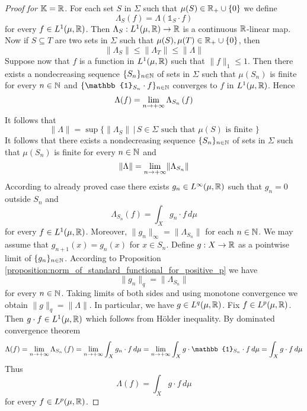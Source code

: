 \begin{proof}[Proof for $\mathbb{K}={\mathbb R}$]
  For each set $S$ in $\Sigma$ such that $\mu(S) \in {\mathbb R}_+\cup \{0\}$ we define
  $$\Lambda_S(f) = \Lambda\left(\mathbb{1}_S\cdot f\right)$$
  for every $f \in L^1(\mu,{\mathbb R})$. Then $\Lambda_S:L^1(\mu,{\mathbb R})\rightarrow {\mathbb R}$ is a continuous ${\mathbb R}$-linear map. Now if $S\subseteq T$ are two sets in $\Sigma$ such that $\mu(S),\mu(T) \in {\mathbb R}_+\cup \{0\}$, then
  $$\lVert \Lambda_S\rVert \leq \lVert \Lambda_T\rVert \leq \lVert \Lambda \rVert$$
  Suppose now that $f$ is a function in $L^1(\mu, {\mathbb R})$ such that $\lVert f \rVert_1 \leq 1$. Then there exists a nondecreasing sequence $\{S_n\}_{n\in {\mathbb N}}$ of sets in $\Sigma$ such that $\mu(S_n)$ is finite for every $n\in {\mathbb N}$ and $\{\mathbb{1}_{S_n}\cdot f\}_{n\in \NN}$ converges to $f$ in $L^1(\mu, {\mathbb R})$. Hence
  $$\Lambda(f) = \lim_{n\rightarrow +\infty}\Lambda_{S_n}\left(f\right)$$
  It follows that
  $$\lVert \Lambda \rVert = \sup \big\{\lVert \Lambda_S \rVert\,\big|\,S\in \Sigma\mbox{ such that }\mu(S)\mbox{ is finite }\}$$
  It follows that there exists a nondecreasing sequence $\{S_n\}_{n\in {\mathbb N}}$ of sets in $\Sigma$ such that $\mu(S_n)$ is finite for every $n\in {\mathbb N}$ and
  $$\lVert \Lambda \rVert = \lim_{n\rightarrow +\infty}\lVert \Lambda_{S_n} \rVert$$
  According to already proved case there exists $g_n \in L^{\infty}(\mu,{\mathbb R})$ such that $g_n = 0$ outside $S_n$ and
  $$\Lambda_{S_n}(f) = \int_X g_n\cdot f\,d\mu$$
  for every $f\in L^1(\mu,{\mathbb R})$. Moreover, $\lVert g_n \rVert_{\infty} = \lVert \Lambda_{S_n}\rVert$ for each $n \in {\mathbb N}$. We may assume that $g_{n+1}(x) = g_n(x)$ for $x\in S_n$. Define $g:X\rightarrow {\mathbb R}$ as a pointwise limit of $\{g_n\}_{n\in {\mathbb N}}$. According to Proposition \ref{proposition:norm_of_standard_functional_for_positive_p} we have
  $$\lVert g_n \rVert_{q} = \lVert \Lambda_{S_n} \rVert$$
  for every $n \in {\mathbb N}$. Taking limits of both sides and using monotone convergence we obtain $\lVert g \rVert_{q} = \lVert \Lambda \rVert$. In particular, we have $g\in L^q(\mu, {\mathbb R})$. Fix $f \in L^p(\mu,{\mathbb R})$. Then $g\cdot f \in L^1(\mu,{\mathbb R})$ which follows from H{\"o}lder inequality. By dominated convergence theorem
  $$\Lambda(f) = \lim_{n\ra +\infty}\Lambda_{S_n}\left(f\right) = \lim_{n\ra +\infty}\int_X g_n\cdot f\,d\mu = \lim_{n\ra +\infty} \int_X g\cdot \mathbb{1}_{S_n}\cdot f\,d\mu = \int_X g\cdot f\,d\mu$$
  Thus
  $$\Lambda(f) = \int_X g\cdot f\,d\mu$$
  for every $f \in L^p(\mu, {\mathbb R})$.
\end{proof}


















